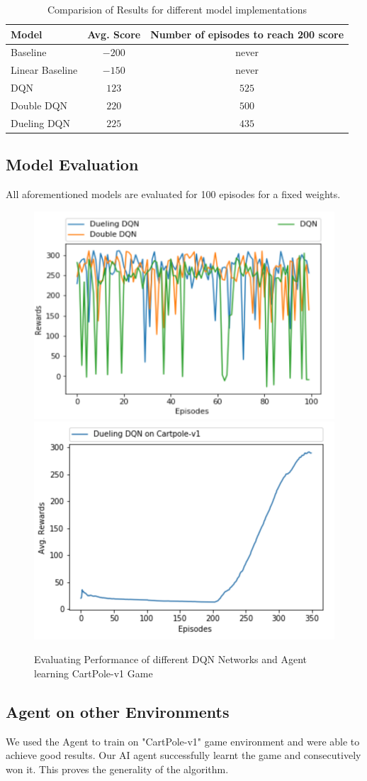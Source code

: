\label{sec:exp}
\begin{table}%
\centering
\begin{tabular}{|l|c|c|}
\hline
Model & Avg. Score  & Number of episodes to reach 200 score  \\
\hline
Baseline & $-200$ & never \\
\hline
Linear Baseline & $-150$ & never \\
\hline
DQN & $123$ & $525$ \\
\hline
Double DQN & $220$ & $500$ \\
\hline
Dueling DQN & $225$ & $435$ \\
\hline
\end{tabular}
\caption{Comparision of Results for different model implementations}
\label{tab:Variants of DQN}
\end{table}


\subsection{ Model Evaluation}

All aforementioned models are evaluated for 100 episodes for a fixed weights. \\  
\begin{figure}[!ht]
\centering
\includegraphics[scale=0.50,width=0.50\columnwidth]{figures/Picture2.png}%
\includegraphics[scale=0.50,width=0.50\columnwidth]{figures/Cartpolev1.png}%

\caption{ Evaluating Performance of different DQN Networks and Agent learning CartPole-v1 Game}%
\label{fig:Different DQN Performance}%
\end{figure}

\subsection{ Agent on other Environments}
We used the Agent to train on "CartPole-v1" game environment and were able to achieve good results. Our AI agent successfully learnt the game and consecutively won it. This proves the generality of the algorithm.

